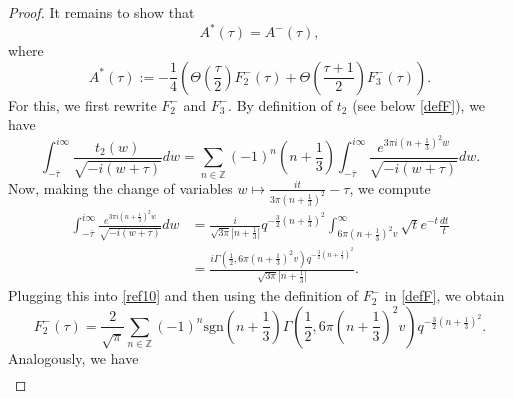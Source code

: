 \documentclass[12pt,reqno]{amsart}
\renewcommand{\o}{{\omega}}
\renewcommand{\t}{\tau}
\renewcommand{\(}{\left\(}
\renewcommand{\)}{\right\)}
\numberwithin{equation}{section}
\theoremstyle{plain}
\theoremstyle{definition}
\numberwithin{equation}{section}
\begin{document}
\begin{proof}
It remains to show that
\begin{equation}\label{ident}
A^*(\t)=A^{-}(\t),
\end{equation}
where
\begin{equation}\label{Astar}
A^*(\t):=-\frac{1}{4}\left(\Theta\left(\frac{\t}{2}\right)F^{-}_2(\t)+\Theta\left(\frac{\t+1}{2}\right)F^{-}_3(\t)\right).
\end{equation}
For this, we first rewrite $F^{-}_2$ and $F^{-}_3$. By definition of $t_2$ (see below \eqref{defF}), we have
\begin{equation}\label{ref10}
\int_{-\overline{\t}}^{i\infty}\frac{t_2(w)}{\sqrt{-i(w+\t)}}dw=\sum_{n\in \mathbb{Z}}(-1)^n\left(n+\frac 13\right)\int_{-\overline{\t}}^{i\infty}\frac{e^{3\pi i\left(n+\frac 13\right)^2 w}}{\sqrt{-i(w+\t)}}dw.
\end{equation}
Now, making the change of variables $w\mapsto \frac{it}{3\pi(n+\frac 13)^2}-\t$, we compute 
\begin{align*}%
\int_{-\overline{\t}}^{i\infty}\frac{e^{3\pi i\left(n+\frac 13\right)^2 w}}{\sqrt{-i(w+\t)}}dw%
&=\frac{i}{\sqrt{3\pi}\left|n+\frac 13\right|}q^{-\frac 32\left(n+\frac 13\right)^2}\int_{6\pi\left(n+\frac 13\right)^2v}^{\infty}\sqrt{t}e^{-t}\frac{dt}{t}\nonumber\\
&=\frac{i\Gamma\!\left(\frac 12,6\pi\left(n+\frac 13\right)^2v \right)q^{-\frac 32\left(n+\frac 13\right)^2}}{\sqrt{3\pi}\left|n+\frac 13\right|}.
\end{align*}
 Plugging this into \eqref{ref10} and then using the definition of $F^{-}_2$ in \eqref{defF}, we obtain
\[
F^{-}_2(\t)=\frac{2}{\sqrt{\pi}}\sum_{n\in \mathbb{Z}}(-1)^n\text{sgn}\left(n+\frac 13\right)\Gamma\!\left(\frac 12,6\pi\left(n+\frac 13\right)^2v \right)q^{-\frac 32\left(n+\frac 13\right)^2}.
\]
Analogously, we have  %
\begin{align*}%

\end{align*}
\end{proof}
\end{document}

